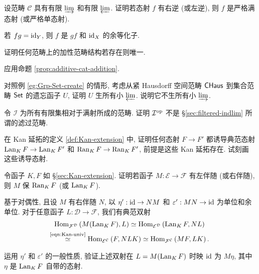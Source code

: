 \begin{Exercises}
	\item 设范畴 $\mathcal{C}$ 具有有限 $\varinjlim$ 和有限 $\varprojlim$. 证明若态射 $f$ 有右逆 (或左逆), 则 $f$ 是严格满态射 (或严格单态射).
	\begin{hint}
		若 $fg = \mathrm{id}_Y$, 则 $f$ 是 $gf$ 和 $\mathrm{id}_X$ 的余等化子.
	\end{hint}
	
	\item 证明任何范畴上的加性范畴结构若存在则唯一.
	\begin{hint}
		应用命题 \ref{prop:additive-cat-addition}.
	\end{hint}

	\item 对照例 \ref{eg:Grp-Set-create} 的情形, 考虑从紧 Hausdorff 空间范畴 $\mathsf{CHaus}$ 到集合范畴 $\mathsf{Set}$ 的遗忘函子 $U$, 证明 $U$ 生所有小 $\varprojlim$. 说明它不生所有小 $\varinjlim$.

	\item 令 $\mathcal{I}$ 为所有有限集相对于满射所成的范畴. 证明 $\mathcal{I}^{\operatorname{op}}$ 不是 \S\ref{sec:filtered-indlim} 所谓的滤过范畴.

	\item 在 Kan 延拓的定义 \ref{def:Kan-extension} 中, 证明任何态射 $F \to F'$ 都诱导典范态射 $\operatorname{Lan}_K F \to \operatorname{Lan}_K F'$ 和 $\operatorname{Ran}_K F \to \operatorname{Ran}_K F'$, 前提是这些 Kan 延拓存在. 试刻画这些诱导态射.

	\item 令函子 $K, F$ 如 \S\ref{sec:Kan-extension}. 证明若函子 $M: \mathcal{E} \to \mathcal{F}$ 有左伴随 (或右伴随), 则 $M$ 保 $\operatorname{Ran}_K F$ (或 $\operatorname{Lan}_K F$).

	\begin{hint}
		基于对偶性, 且设 $M$ 有右伴随 $N$, 以 $\eta': \mathrm{id} \to NM$ 和 $\varepsilon': MN \to \mathrm{id}$ 为单位和余单位. 对于任意函子 $L: \mathcal{D} \to \mathcal{F}$, 我们有典范双射
		\begin{multline*}
			\operatorname{Hom}_{\mathcal{F}^{\mathcal{D}}} \left( M (\operatorname{Lan}_K F) , L \right) \simeq \operatorname{Hom}_{\mathcal{E}^{\mathcal{D}}} \left( \operatorname{Lan}_K F, N L \right) \\
			\stackrel{\text{\eqref{eqn:Kan-univ}}}{\simeq} \operatorname{Hom}_{\mathcal{E}^{\mathcal{C}}} \left( F, NLK \right) \simeq \operatorname{Hom}_{\mathcal{F}^{\mathcal{C}}} \left( MF, LK \right).
		\end{multline*}
		
		运用 $\eta'$ 和 $\varepsilon'$ 的一般性质, 验证上述双射在 $L = M(\operatorname{Lan}_K F)$ 时映 $\mathrm{id}$ 为 $M\eta$, 其中 $\eta$ 是 $\operatorname{Lan}_K F$ 自带的态射.
		

\end{hint}
\end{Exercises}
